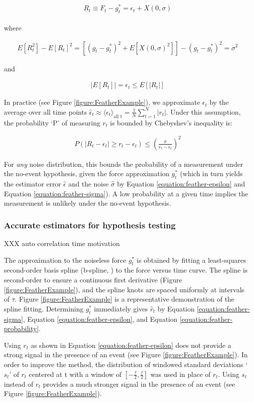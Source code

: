 \documentclass[%
  aip,12pt,tightenlines,
  amsthm,
 amsmath,amssymb
]{article}
\newcommand{\eqs}[1]{
\begin{align*} 
\begin{split}
#1
\end{split}					
\end{align*}}
\newcommand{\eqlab}[2]{
\begin{equation}
\label{equation:#2}
\begin{split}
#1
\end{split}
\end{equation}
}
\newcommand{\fRef}[1]{Figure \ref{figure:#1}}
\newcommand{\eRef}[1]{Equation \ref{equation:#1}}
\newcommand{\pl}[0]{\vspace{6pt}}
\begin{document}
\eqs{ R_t \equiv F_t - g^{*}_t = \epsilon_t + X(0,\sigma) }

where

\eqlab{ E[R_t^2] -E[R_t]^2 = [(g_t-g^{*}_t)^2 + E[X(0,\sigma)^2]] - (g_t-g^{*}_t)^2  = \sigma^2 }{feather-sigma}

and 

\eqlab{ |E[R_t]| = \epsilon_t \le E[|R_t|] }{feather-epsilon}

In practice (see \fRef{FeatherExample}), we approximate $\epsilon_t$ by the average over all time points $\hat{\epsilon}_t \approx \langle \epsilon_t \rangle_{\text{all t}} = \frac{1}{N} \sum_{t=1}^N |r_t|$. Under this assumption, the probability `P' of measuring $r_t$ is bounded by Chebyshev's inequality is:

\eqlab{ P( |R_t-\epsilon_t| \ge r_t-\epsilon_t ) \le
 (\frac{\sigma}{r_t-\epsilon_t})^2 }{feather-probability}


For \emph{any} noise distribution, this bounds the probability of a measurement under the no-event hypothesis, given the force approximation $g^{*}_t$ (which in turn yields the estimator error $\hat{\epsilon}$ and the noise $\hat{\sigma}$ by \eRef{feather-epsilon} and \eRef{feather-sigma}). A low probability at a given time implies the measurement is unlikely under the no-event hypothesis. \pl

\subsubsection{Accurate estimators for hypothesis testing}

XXX auto correlation time motivation \pl 

The approximation to the noiseless force $g^{*}_t$ is obtained by fitting a least-squares second-order basis spline (b-spline, ) to the force versus time curve. The spline is second-order to ensure a continuous first derivative (\fRef{FeatherExample}), and the spline knots are spaced uniformly at intervals of $\tau$. \fRef{FeatherExample} is a representative demonstration of the spline fitting. Determining  $g^{*}_t$ immediately gives $\hat{r}_t$ by  \eRef{feather-sigma}, \eRef{feather-epsilon}, and \eRef{feather-probability}. \pl

Using $r_t$ as shown in \eRef{feather-epsilon} does not provide a strong signal in the presence of an event (see \fRef{FeatherExample}). In order to improve the method, the distribution of windowed standard deviations `$s_t$' of $r_t$ centered at t with a window of $[-\frac{\tau}{2},\frac{\tau}{2}]$ was used in place of $r_t$. Using $s_t$ instead of $r_t$ provides a much stronger signal in the presence of an event (see \fRef{FeatherExample}).  \pl
\end{document}
